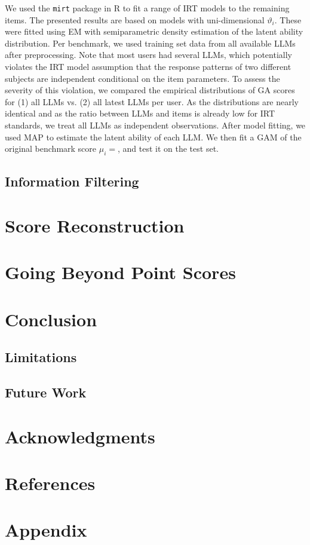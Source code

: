 \documentclass{article}
\begin{document}
We used the \texttt{mirt} package in R to fit a range of IRT models to the remaining items.
The presented results are based on models with uni-dimensional $\vartheta_i$. These were fitted using EM with semiparametric density estimation of the latent ability distribution.
Per benchmark, we used training set data from all available LLMs after preprocessing. Note that most users had several LLMs, which potentially violates the IRT model assumption that the response patterns of two different subjects are independent conditional on the item parameters. To assess the severity of this violation, we compared the empirical distributions of GA scores for (1) all LLMs vs. (2) all latest LLMs per user. As the distributions are nearly identical and as the ratio between LLMs and items is already low for IRT standards, we treat all LLMs as independent observations.
After model fitting, we used MAP to estimate the latent ability of each LLM. We then fit a GAM of the original benchmark score $\mu_i = $, and test it on the test set. %

\subsection{Information Filtering}

\section{Score Reconstruction}

\section{Going Beyond Point Scores}
\section{Conclusion}
\subsection{Limitations}
\subsection{Future Work}

\section*{Acknowledgments}
\section*{References}
\section*{Appendix}
\end{document}
